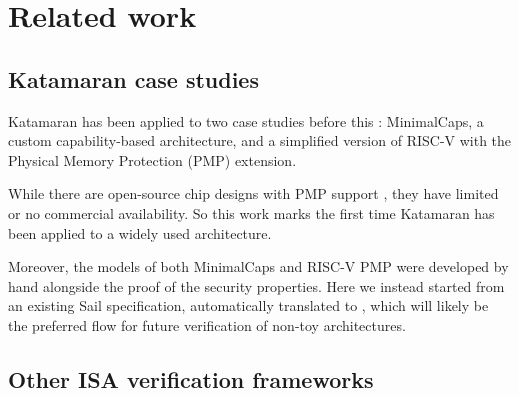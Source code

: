 \section{Related work}

\subsection{Katamaran case studies}

Katamaran has been applied to two case studies before this \cite{Huyghebaert2023}: MinimalCaps, a custom capability-based architecture, and a simplified version of RISC-V with the Physical Memory Protection (PMP) extension.

While there are open-source chip designs with PMP support \cite{ChipsAlliance}, they have limited or no commercial availability. So this work marks the first time Katamaran has been applied to a widely used architecture.

Moreover, the \usail models of both MinimalCaps and RISC-V PMP were developed by hand alongside the proof of the security properties. Here we instead started from an existing Sail specification, automatically translated to \usail, which will likely be the preferred flow for future verification of non-toy architectures.

\subsection{Other ISA verification frameworks}

